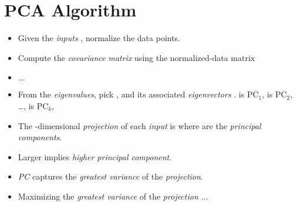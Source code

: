 \documentclass[
	number={7},
	title={Principal Component Analysis}
]{cs584notes}
\begin{document}
\section{PCA Algorithm}\label{sec:pca-algorithm}
\begin{itemize}
	\item Given the \emph{inputs} , normalize the data points.
	\item Compute the  \emph{covariance matrix}  using the normalized-data matrix 
	\item $\dots$
	\item From the  \emph{eigenvalues}, pick , and its associated \emph{eigenvectors} .
	 is \emph{$\mbox{PC}_{1}$},  is \emph{$\mbox{PC}_{2}$}, \dots,  is \emph{$\mbox{PC}_{k}$},
	\item The -dimensional \emph{projection} of each \emph{input} is  where  are the \emph{principal components}.
	\item Larger \data{$\lambda$} implies \emph{higher principal component}.
	\item \emph{PC} captures the \emph{greatest variance} of the \emph{projection}.
	\item Maximizing the \emph{greatest variance} of the \emph{projection} $\dots$
\end{itemize}
\end{document}
